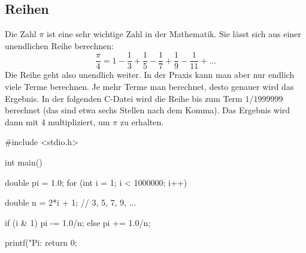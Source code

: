 \subsection{Reihen}
\label{sec:c:reihen}

Die Zahl $\pi$ ist eine sehr wichtige Zahl in der Mathematik. Sie lässt sich aus einer unendlichen Reihe berechnen:
\begin{equation*}
  \frac{\pi}{4} = 1 - \frac{1}{3} + \frac{1}{5} - \frac{1}{7} + \frac{1}{9} - \frac{1}{11} + \ldots
\end{equation*}
Die Reihe geht also unendlich weiter. In der Praxis kann man aber nur endlich viele Terme berechnen. Je mehr Terme man berechnet, desto genauer wird das Ergebnis. In der folgenden C-Datei wird die Reihe bis zum Term $1/1999999$ berechnet (das sind etwa sechs Stellen nach dem Komma). Das Ergebnis wird dann mit 4 multipliziert, um $\pi$ zu erhalten.

\begin{code}
#include <stdio.h>

int main() {
    double pi = 1.0;
    for (int i = 1; i < 1000000; i++) {
        double n = 2*i + 1;     // 3, 5, 7, 9, ...

        if (i & 1)
            pi -= 1.0/n;
        else
            pi += 1.0/n;
    }   

    printf("Pi: %
    return 0;
}
\end{code}
